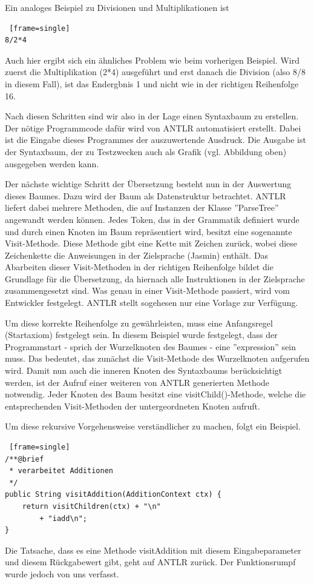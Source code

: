 \documentclass[12pt, a4paper, oneside, ngerman]{article}
\begin{document}
Ein analoges Beispiel zu Divisionen und Multiplikationen ist
\begin{lstlisting} [frame=single]
8/2*4
\end{lstlisting}
Auch hier ergibt sich ein ähnliches Problem wie beim vorherigen Beispiel. Wird zuerst die Multiplikation (2*4) ausgeführt und erst danach die Division (also 8/8 in diesem Fall), ist das Endergbnis 1 und nicht wie in der richtigen Reihenfolge 16.

Nach diesen Schritten sind wir also in der Lage einen Syntaxbaum zu erstellen. Der nötige Programmcode dafür wird von ANTLR automatisiert erstellt. Dabei ist die Eingabe dieses Programmes der auszuwertende Ausdruck. Die Ausgabe ist der Syntaxbaum, der zu Testzwecken auch als Grafik (vgl. Abbildung oben) ausgegeben werden kann. 

\pagebreak

Der nächste wichtige Schritt der Übersetzung besteht nun in der Auswertung dieses Baumes. Dazu wird der Baum als Datenstruktur betrachtet. ANTLR liefert dabei mehrere Methoden, die auf Instanzen der Klasse ''ParseTree'' angewandt werden können. 
Jedes Token, das in der Grammatik definiert wurde und durch einen Knoten im Baum repräsentiert wird, besitzt eine sogenannte Visit-Methode. Diese Methode gibt eine Kette mit Zeichen zurück, wobei diese Zeichenkette die Anweisungen in der Zielsprache (Jasmin) enthält. Das Abarbeiten dieser Visit-Methoden in der richtigen Reihenfolge bildet die Grundlage für die Übersetzung, da hiernach alle Instruktionen in der Zielsprache zusammengesetzt sind. Was genau in einer Visit-Methode passiert, wird vom Entwickler festgelegt. ANTLR stellt sogehesen nur eine Vorlage zur Verfügung.

Um diese korrekte Reihenfolge zu gewährleisten, muss eine Anfangsregel (Startaxiom) festgelegt sein. In diesem Beispiel wurde festgelegt, dass der Programmstart - sprich der Wurzelknoten des Baumes - eine ''expression'' sein muss. Das bedeutet, das zunächst die Visit-Methode des Wurzelknoten aufgerufen wird. Damit nun auch die inneren Knoten des Syntaxbaums berücksichtigt werden, ist der Aufruf einer weiteren von ANTLR generierten Methode notwendig. Jeder Knoten des Baum besitzt eine visitChild()-Methode, welche die entsprechenden Visit-Methoden der untergeordneten Knoten aufruft.

Um diese rekursive Vorgehensweise verständlicher zu machen, folgt ein Beispiel.


\begin{lstlisting} [frame=single]
/**@brief
 * verarbeitet Additionen
 */
public String visitAddition(AdditionContext ctx) {
	return visitChildren(ctx) + "\n"
		+ "iadd\n";
}
\end{lstlisting}
Die Tatsache, dass es eine Methode visitAddition mit diesem Eingabeparameter und diesem Rückgabewert gibt, geht auf ANTLR zurück. Der Funktionsrumpf wurde jedoch von uns verfasst.
\end{document}
